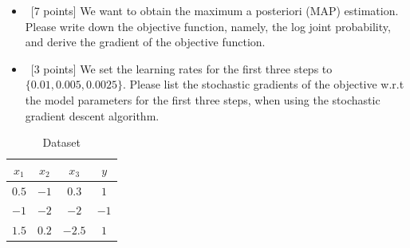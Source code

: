\documentclass[12pt, fullpage,letterpaper]{article}
\begin{document}
\begin{enumerate}
	\begin{itemize}
		\item~[7 points] We want to obtain the  maximum a posteriori (MAP) estimation. Please write down the objective function, namely, the log joint probability, and derive the gradient of the objective function. 
		\item~[3 points] We set the learning rates for the first three steps to $\{0.01, 0.005, 0.0025\}$.  Please list the stochastic gradients of the objective w.r.t the model parameters for the first three steps, when using the stochastic gradient descent algorithm. 
	\end{itemize}
	\begin{table}[h]
		\centering
		\begin{tabular}{ccc|c}
			$x_1$ & $x_2$ & $x_3$ &  $y$\\ 
			\hline\hline
			$0.5$ & $-1$ & $0.3$ & $1$ \\ \hline
			$-1$ & $-2$ & $-2$ & $-1$\\ \hline
			$1.5$ & $0.2$ & $-2.5$ & $1$\\ \hline
		\end{tabular}
	\caption{Dataset} 
	\label{tb:dt}
	\end{table}

	
\end{enumerate}
\end{document}
